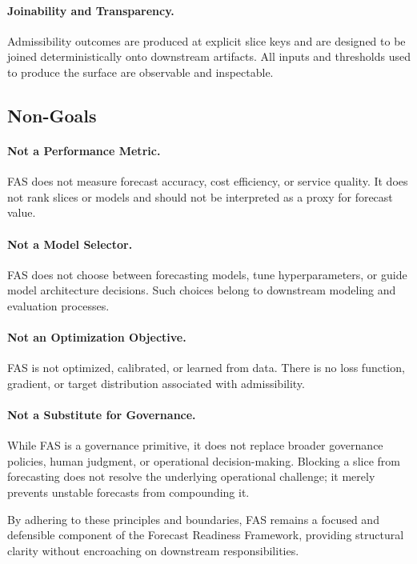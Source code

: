 \paragraph{Joinability and Transparency.}
Admissibility outcomes are produced at explicit slice keys and are designed to be
joined deterministically onto downstream artifacts. All inputs and thresholds
used to produce the surface are observable and inspectable.

\subsection{Non-Goals}

\paragraph{Not a Performance Metric.}
FAS does not measure forecast accuracy, cost efficiency, or service quality. It
does not rank slices or models and should not be interpreted as a proxy for
forecast value.

\paragraph{Not a Model Selector.}
FAS does not choose between forecasting models, tune hyperparameters, or guide
model architecture decisions. Such choices belong to downstream modeling and
evaluation processes.

\paragraph{Not an Optimization Objective.}
FAS is not optimized, calibrated, or learned from data. There is no loss
function, gradient, or target distribution associated with admissibility.

\paragraph{Not a Substitute for Governance.}
While FAS is a governance primitive, it does not replace broader governance
policies, human judgment, or operational decision-making. Blocking a slice from
forecasting does not resolve the underlying operational challenge; it merely
prevents unstable forecasts from compounding it.

By adhering to these principles and boundaries, FAS remains a focused and
defensible component of the Forecast Readiness Framework, providing structural
clarity without encroaching on downstream responsibilities.
